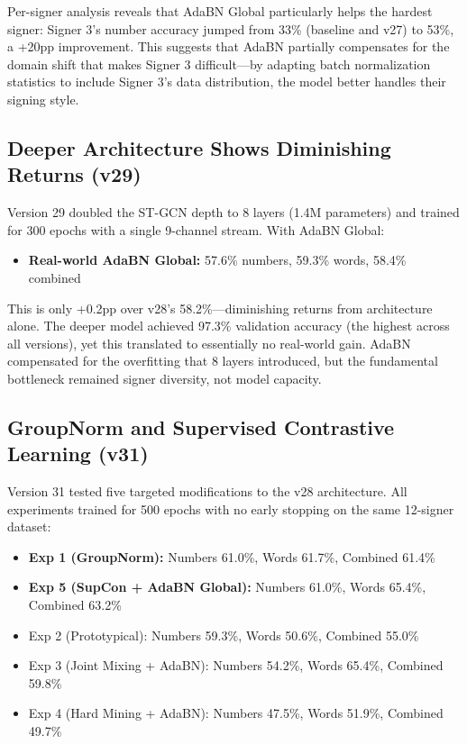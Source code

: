 \documentclass[conference]{IEEEtran}
\begin{document}
Per-signer analysis reveals that AdaBN Global particularly helps the hardest signer: Signer 3's number accuracy jumped from 33\% (baseline and v27) to 53\%, a +20pp improvement. This suggests that AdaBN partially compensates for the domain shift that makes Signer 3 difficult---by adapting batch normalization statistics to include Signer 3's data distribution, the model better handles their signing style.

\subsection{Deeper Architecture Shows Diminishing Returns (v29)}
\label{sec:v29_results}

Version 29 doubled the ST-GCN depth to 8 layers (1.4M parameters) and trained for 300 epochs with a single 9-channel stream. With AdaBN Global:

\begin{itemize}
    \item \textbf{Real-world AdaBN Global:} 57.6\% numbers, 59.3\% words, 58.4\% combined
\end{itemize}

This is only +0.2pp over v28's 58.2\%---diminishing returns from architecture alone. The deeper model achieved 97.3\% validation accuracy (the highest across all versions), yet this translated to essentially no real-world gain. AdaBN compensated for the overfitting that 8 layers introduced, but the fundamental bottleneck remained signer diversity, not model capacity.

\subsection{GroupNorm and Supervised Contrastive Learning (v31)}
\label{sec:v31_results}

Version 31 tested five targeted modifications to the v28 architecture. All experiments trained for 500 epochs with no early stopping on the same 12-signer dataset:

\begin{itemize}
    \item \textbf{Exp 1 (GroupNorm):} Numbers 61.0\%, Words 61.7\%, Combined 61.4\%
    \item \textbf{Exp 5 (SupCon + AdaBN Global):} Numbers 61.0\%, Words 65.4\%, Combined 63.2\%
    \item Exp 2 (Prototypical): Numbers 59.3\%, Words 50.6\%, Combined 55.0\%
    \item Exp 3 (Joint Mixing + AdaBN): Numbers 54.2\%, Words 65.4\%, Combined 59.8\%
    \item Exp 4 (Hard Mining + AdaBN): Numbers 47.5\%, Words 51.9\%, Combined 49.7\%
\end{itemize}
\end{document}
